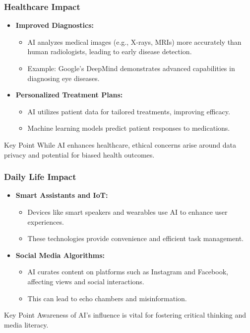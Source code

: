 \documentclass[aspectratio=169]{beamer}
\begin{document}
\begin{frame}[fragile]
    \frametitle{Healthcare Impact}
    \begin{itemize}
        \item \textbf{Improved Diagnostics:} 
            \begin{itemize}
                \item AI analyzes medical images (e.g., X-rays, MRIs) more accurately than human radiologists, leading to early disease detection.
                \item Example: Google's DeepMind demonstrates advanced capabilities in diagnosing eye diseases.
            \end{itemize}
        
        \item \textbf{Personalized Treatment Plans:} 
            \begin{itemize}
                \item AI utilizes patient data for tailored treatments, improving efficacy.
                \item Machine learning models predict patient responses to medications.
            \end{itemize}
    \end{itemize}
    
    \begin{block}{Key Point}
        While AI enhances healthcare, ethical concerns arise around data privacy and potential for biased health outcomes.
    \end{block}
\end{frame}

\begin{frame}[fragile]
    \frametitle{Daily Life Impact}
    \begin{itemize}
        \item \textbf{Smart Assistants and IoT:} 
            \begin{itemize}
                \item Devices like smart speakers and wearables use AI to enhance user experiences.
                \item These technologies provide convenience and efficient task management.
            \end{itemize}
        
        \item \textbf{Social Media Algorithms:} 
            \begin{itemize}
                \item AI curates content on platforms such as Instagram and Facebook, affecting views and social interactions.
                \item This can lead to echo chambers and misinformation.
            \end{itemize}
    \end{itemize}
    
    \begin{block}{Key Point}
        Awareness of AI's influence is vital for fostering critical thinking and media literacy.
    \end{block}
\end{frame}
\end{document}
